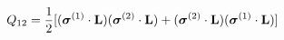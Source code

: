 \begin{equation}
Q_{12} = \frac{1}{2} [(\mbox{\boldmath $\sigma$}^{(1)} \cdot {\bf L}) 
(\mbox{\boldmath $\sigma$}^{(2)} \cdot {\bf L})+ (\mbox{\boldmath 
$\sigma$}^{(2)} \cdot {\bf L}) (\mbox{\boldmath $\sigma$}^{(1)} \cdot {\bf L})] 
\end{equation}

